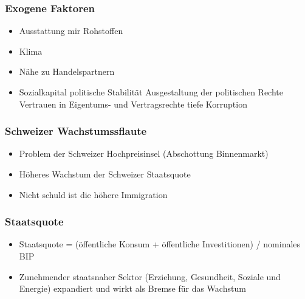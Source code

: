 \subsubsection{Exogene Faktoren}
\begin{itemize}
	\item Ausstattung mir Rohstoffen
	\item Klima
	\item Nähe zu Handelspartnern
	\item Sozialkapital
	\subitem politische Stabilität
	\subitem Ausgestaltung der politischen Rechte
	\subitem Vertrauen in Eigentums- und Vertragsrechte
	\subitem tiefe Korruption
\end{itemize}
\begin{multicols}{2}
\subsubsection{Schweizer Wachstumssflaute}
\begin{itemize}
	\item Problem der Schweizer Hochpreisinsel (Abschottung Binnenmarkt)
	\item Höheres Wachstum der Schweizer Staatsquote
	\item Nicht schuld ist die höhere Immigration
\end{itemize}
\subsubsection{Staatsquote}
\begin{itemize}
	\item Staatsquote = (öffentliche Konsum + öffentliche Investitionen) / nominales BIP
	\item Zunehmender staatsnaher Sektor (Erziehung, Gesundheit, Soziale und Energie) expandiert und wirkt als Bremse für das Wachstum
\end{itemize}
\end{multicols}